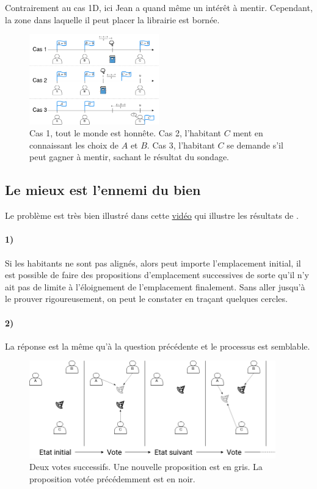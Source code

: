 \documentclass[a4paper,10pt,oneside]{article}
\begin{document}
Contrairement au cas 1D, ici Jean a quand même un intérêt à mentir.
Cependant, la zone dans laquelle il peut placer la librairie est bornée.


\begin{figure}[!ht]
\centering
\includegraphics[width=0.50\textwidth]{figures/indice_library.png}
\caption{
  Cas 1, tout le monde est honnête. 
  Cas 2, l'habitant $C$ ment en connaissant les choix de $A$ et $B$. 
  Cas 3, l'habitant $C$ se demande s'il peut gagner à mentir, sachant le résultat du sondage.}
\end{figure}


\subsection{Le mieux est l'ennemi du bien}

Le problème est très bien illustré dans cette \href{https://www.youtube.com/watch?v=goQ4ii-zBMw}{vidéo} qui illustre les résultats de \cite{MCKELVEY1976472}.

\paragraph*{1)} 
Si les habitants ne sont pas alignés, alors peut importe l'emplacement initial, il est possible de faire des propositions d'emplacement successives de sorte qu'il n'y ait pas de limite à l'éloignement de l'emplacement finalement.
Sans aller jusqu'à le prouver rigoureusement, on peut le constater en traçant quelques cercles.

\paragraph*{2)}
La réponse est la même qu'à la question précédente et le processus est semblable.

\begin{figure}[!ht]
  \centering
  \includegraphics*[width=0.95\textwidth]{figures/indice_democracy.png}
  \caption{Deux votes successifs. Une nouvelle proposition est en gris. La proposition votée précédemment est en noir.}
\end{figure}
\end{document}
